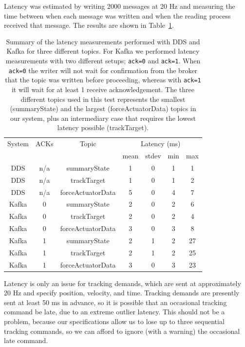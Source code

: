 \documentclass[]{spie}  %
\begin{document}
Latency was estimated by writing 2000 messages at 20 Hz and measuring the time between when each message was written and when the reading process received that message.
The results are shown in Table~\ref{tab:latency}.

\begin{table}[h]
    \centering
    \begin{tabular}{|c|c|c|c|c|c|c|}
        \hline
        System & ACKs & Topic             & \multicolumn{4}{c|}{Latency (ms)} \\
               &      &                   & mean & stdev & min & max     \\
        \hline
        DDS    & n/a  & summaryState      & 1    & 0     & 1   & 1       \\
        DDS    & n/a  & trackTarget       & 1    & 0     & 1   & 2       \\
        DDS    & n/a  & forceActuatorData & 5    & 0     & 4   & 7       \\
        Kafka  & 0    & summaryState      & 2    & 0     & 2   & 6       \\
        Kafka  & 0    & trackTarget       & 2    & 0     & 2   & 4       \\
        Kafka  & 0    & forceActuatorData & 3    & 0     & 3   & 8       \\
        Kafka  & 1    & summaryState      & 2    & 1     & 2   & 27      \\
        Kafka  & 1    & trackTarget       & 2    & 1     & 2   & 25      \\
        Kafka  & 1    & forceActuatorData & 3    & 0     & 3   & 23      \\
        \hline
    \end{tabular}
    \caption{
      Summary of the latency measurements performed with DDS and Kafka for three different topics.
      For Kafka we performed latency measurements with two different setups; \texttt{ack=0} and \texttt{ack=1}.
      When  \texttt{ack=0} the writer will not wait for confirmation from the broker that the topic was written before proceeding, whereas with  \texttt{ack=1} it will wait for at least 1 receive acknowledgement.
      The three different topics used in this test represents the smallest (summaryState) and the largest (forceActuatorData) topics in our system, plus an intermediary case that requires the lowest latency possible (trackTarget).
    }
    \label{tab:latency}
\end{table}

Latency is only an issue for tracking demands, which are sent at approximately 20 Hz and specify position, velocity, and time.
Tracking demands are presently sent at least 50 ms in advance, so it is possible that an occasional tracking command be late, due to an extreme outlier latency.
This should not be a problem, because our specifications allow us to lose up to three sequential tracking commands, so we can afford to ignore (with a warning) the occasional late command.
\end{document}

